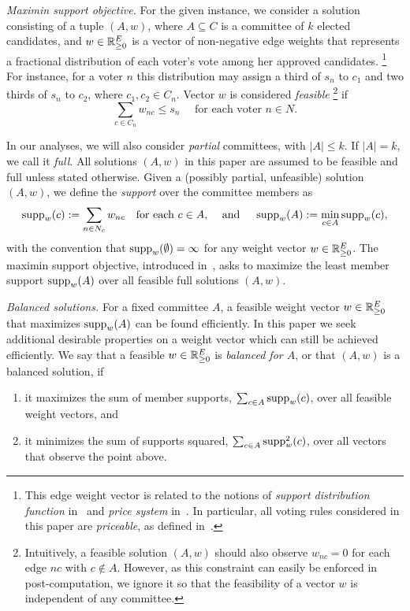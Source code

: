 \emph{Maximin support objective.} 
For the given instance, we consider a solution consisting of a tuple $(A,w)$, where $A\subseteq C$ is a committee of $k$ elected candidates, and $w\in\mathbb{R}_{\geq 0}^E$ is a vector of non-negative edge weights that represents a fractional distribution of each voter's vote among her approved candidates.%
\footnote{This edge weight vector is related to the notions of \emph{support distribution function} in~\cite{sanchez2016maximin} and \emph{price system} in~\cite{peters2019proportionality}. In particular, all voting rules considered in this paper are \emph{priceable}, as defined in~\cite{peters2019proportionality}.} 
For instance, for a voter $n$ this distribution may assign a third of $s_n$ to $c_1$ and two thirds of $s_n$ to $c_2$, where $c_1, c_2\in C_n$.
Vector $w$ is considered \emph{feasible}%
\footnote{Intuitively, a feasible solution $(A,w)$ should also observe $w_{nc}=0$ for each edge $nc$ with $c\not\in A$. 
However, as this constraint can easily be enforced in post-computation, we ignore it so that the feasibility of a vector $w$ is independent of any committee.} 
if  %
%
\begin{equation}
    \sum_{c\in C_n} w_{nc}\leq s_n \quad \text{ for each voter } n\in N. \label{eq:feasible}
\end{equation}

In our analyses, we will also consider \emph{partial} committees, with $|A|\leq k$. If $|A|=k$, we call it \emph{full}. 
All solutions $(A,w)$ in this paper are assumed to be feasible and full unless stated otherwise. 
Given a (possibly partial, unfeasible) solution $(A,w)$, we define the \emph{support} over the committee members as 
\begin{equation}
\operatorname{supp}_w(c):=\sum_{n\in N_c} w_{nc} \quad \text{for each $c\in A, \quad$ and } \quad \operatorname{supp}_w(A):=\min_{c\in A} \operatorname{supp}_w(c), \label{eq:support}
\end{equation}
with the convention that $\operatorname{supp}_w(\emptyset)=\infty$ for any weight vector $w\in\mathbb{R}_{\geq 0}^E$. 
The maximin support objective, introduced in~\cite{sanchez2016maximin}, asks to maximize the least member support $\operatorname{supp}_w(A)$ over all feasible full solutions $(A,w)$. 

\emph{Balanced solutions.}
For a fixed committee $A$, a feasible weight vector $w\in\mathbb{R}_{\geq 0}^E$ that maximizes $\operatorname{supp}_w(A)$ can be found efficiently. In this paper we seek additional desirable properties on a weight vector which can still be achieved efficiently. We say that a feasible $w\in\mathbb{R}_{\geq 0}^E$ is \emph{balanced for $A$}, or that $(A,w)$ is a balanced solution, if
\begin{enumerate}
    \item it maximizes the sum of member supports, $\sum_{c\in A} \operatorname{supp}_w(c)$, over all feasible weight vectors, and 
    \item it minimizes the sum of supports squared, $\sum_{c\in A} \operatorname{supp}_w^2(c)$, over all vectors that observe the point above. 
\end{enumerate}

